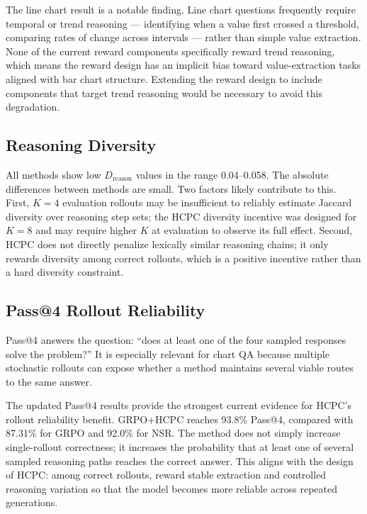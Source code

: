 \documentclass{iutbscthesis}
\begin{document}
The line chart result is a notable finding. Line chart questions frequently require temporal or trend reasoning --- identifying when a value first crossed a threshold, comparing rates of change across intervals --- rather than simple value extraction. None of the current reward components specifically reward trend reasoning, which means the reward design has an implicit bias toward value-extraction tasks aligned with bar chart structure. Extending the reward design to include components that target trend reasoning would be necessary to avoid this degradation.

\subsection{Reasoning Diversity}

All methods show low $D_{\text{reason}}$ values in the range 0.04--0.058. The absolute differences between methods are small. Two factors likely contribute to this. First, $K=4$ evaluation rollouts may be insufficient to reliably estimate Jaccard diversity over reasoning step sets; the HCPC diversity incentive was designed for $K=8$ and may require higher $K$ at evaluation to observe its full effect. Second, HCPC does not directly penalize lexically similar reasoning chains; it only rewards diversity among correct rollouts, which is a positive incentive rather than a hard diversity constraint.

\subsection{Pass@4 Rollout Reliability}

Pass@4 answers the question: ``does at least one of the four sampled responses solve the problem?'' It is especially relevant for chart QA because multiple stochastic rollouts can expose whether a method maintains several viable routes to the same answer.

The updated Pass@4 results provide the strongest current evidence for HCPC's rollout reliability benefit. GRPO+HCPC reaches 93.8\% Pass@4, compared with 87.31\% for GRPO and 92.0\% for NSR. The method does not simply increase single-rollout correctness; it increases the probability that at least one of several sampled reasoning paths reaches the correct answer. This aligns with the design of HCPC: among correct rollouts, reward stable extraction and controlled reasoning variation so that the model becomes more reliable across repeated generations.
\end{document}

